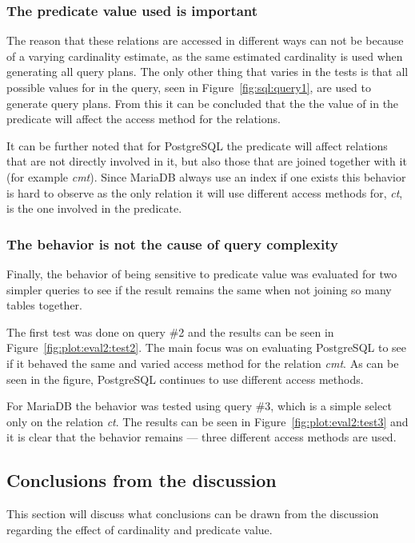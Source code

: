 \subsubsection{The predicate value used is important}
The reason that these relations are accessed in different ways can not be
because of a varying cardinality estimate, as the same estimated cardinality is
used when generating all query plans. The only other thing that varies in the
tests is that all possible values for  in the query, seen in
Figure~\ref{fig:sql:query1}, are used to generate query plans. From this it can
be concluded that the the value of  in the predicate  will affect the access method for the relations.

It can be further noted that for PostgreSQL the predicate will affect relations
that are not directly involved in it, but also those that are joined together
with it (for example \textit{cmt}). Since MariaDB always use an index if one
exists this behavior is hard to observe as the only relation it will use
different access methods for, \textit{ct}, is the one involved in the predicate.

\subsubsection{The behavior is not the cause of query complexity}
Finally, the behavior of being sensitive to predicate value was evaluated for
two simpler queries to see if the result remains the same when not
joining so many tables together.

The first test was done on query \#2 and the results can be seen in
Figure~\ref{fig:plot:eval2:test2}. The main focus was on evaluating PostgreSQL
to see if it behaved the same and varied access method for the relation
\textit{cmt}. As can be seen in the figure, PostgreSQL continues to use different
access methods.

For MariaDB the behavior was tested using query \#3, which is a simple select
only on the relation \textit{ct}. The results can be seen in
Figure~\ref{fig:plot:eval2:test3} and it is clear that the behavior remains ---
three different access methods are used.

\subsection{Conclusions from the discussion}
This section will discuss what conclusions can be drawn from the discussion
regarding the effect of cardinality and predicate value.

